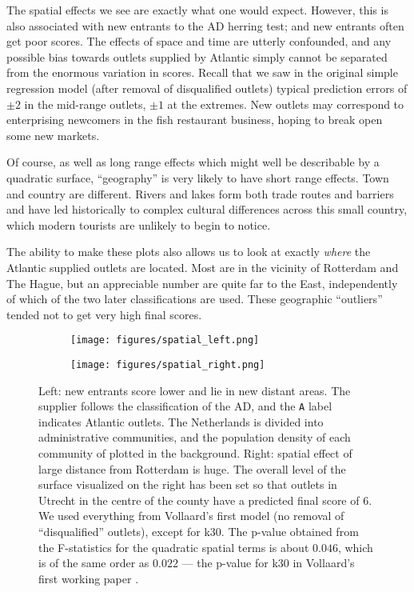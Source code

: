 \documentclass[alpha-refs]{wiley-article}
\begin{document}
The spatial effects we see are exactly what one would expect. However, this is also associated with new entrants to the AD herring test; and new entrants often get poor scores. The effects of space and time are utterly confounded, and any possible bias towards outlets supplied by Atlantic simply cannot be separated from the enormous variation in scores. Recall that we saw in the original simple regression model (after removal of disqualified outlets) typical prediction errors of $\pm 2$ in the mid-range outlets, $\pm 1$ at the extremes. 
New outlets may correspond to enterprising newcomers in the fish restaurant business, hoping to break open some new markets.

Of course, as well as long range effects which might well be describable by a quadratic surface, ``geography'' is very likely to have short range effects. Town and country are different. Rivers and lakes form both trade routes and barriers and have led historically to complex cultural differences across this small country, which modern tourists are unlikely to begin to notice.

The ability to make these plots also allows us to look at exactly \emph{where} the Atlantic supplied outlets are located.  Most are in the vicinity of Rotterdam and The Hague, but an appreciable number are quite far to the East, independently of which of the two later classifications are used. These geographic ``outliers'' tended not to get very high final scores.


\begin{figure}[htp]
\begin{subfigure}{0.48\textwidth}
\texttt{[image: figures/spatial\_left.png]}
\end{subfigure}
\begin{subfigure}{0.48\textwidth}
\texttt{[image: figures/spatial\_right.png]}
\end{subfigure}
\caption{Left: new entrants score lower and lie in new distant areas.  The supplier follows the classification of the AD, and the \texttt{A} label indicates Atlantic outlets.  The Netherlands is divided into administrative communities, and the population density of each community of plotted in the background.  Right: spatial effect of large distance from Rotterdam is huge.  The overall level of the surface visualized on the right has been set so that outlets in Utrecht in the centre of the county have a predicted final score of 6.  We used everything from Vollaard's first model (no removal of ``disqualified'' outlets), except for k30.  The p-value obtained from the F-statistics for the quadratic spatial terms is about $0.046$, which is of the same order as $0.022$ --- the p-value for k30 in Vollaard's first working paper \citep*{vollaard1}.}
\label{fig:maps}
\end{figure}
\end{document}
